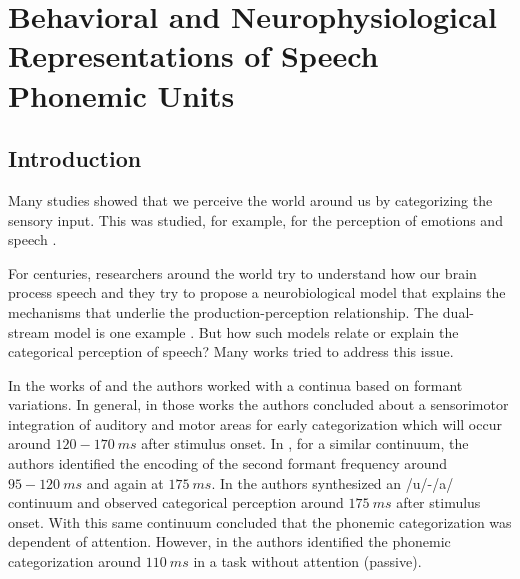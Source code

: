 \chapter{Behavioral and Neurophysiological Representations of Speech Phonemic Units}\label{ch:adrielledecar3}
\begin{affils} 
\end{affils}

\section*{Introduction}
\label{sec:intro}
Many studies showed that we perceive the world around us by categorizing the
sensory input. This was studied, for example, for the perception of emotions
\citep{mccullough2009categorical} and speech \citep{liberman1957discrimination}.

For centuries, researchers around the world try to understand how our brain
process speech and they try to propose a neurobiological model that explains
the mechanisms that underlie the production-perception relationship. The
dual-stream model is one example \citep{hickok2007cortical}. But how such
models relate or explain the categorical perception of speech? Many works tried
to address this issue.

In the works of \citet{alho2016early, chevillet2013automatic} and
\citet{mottonen2014attention} the authors worked with a continua based on
formant variations. In general, in those works the authors concluded about a
sensorimotor integration of auditory and motor areas for early categorization
which will occur around $120 - 170~ms$ after stimulus onset. In \citet{Bouton},
for a similar continuum, the authors identified the encoding of the second
formant frequency around $95-120~ms$ and again at $175~ms$. In
\citet{bidelman2013} the authors synthesized an /u/-/a/ continuum and observed
categorical perception around $175~ms$ after stimulus onset. With this same
continuum \citet{bidelman2017} concluded that the phonemic categorization was
dependent of attention. However, in \citet{chang2010categorical} the authors
identified the phonemic categorization around $110~ms$ in a task without
attention (passive).

